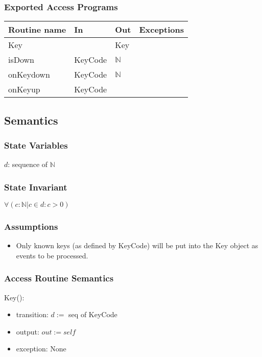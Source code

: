 \documentclass[12pt]{article}
\begin{document}
\subsubsection*{Exported Access Programs}

\begin{tabular}{| l | l | l | l |} %
\hline
\textbf{Routine name} & \textbf{In} & \textbf{Out} & \textbf{Exceptions}\\
\hline
Key &  & Key & ~\\
\hline
isDown & KeyCode & $\mathbb{N}$ & ~\\
\hline
onKeydown & KeyCode & $\mathbb{N}$ & ~\\
\hline
onKeyup & KeyCode &  & ~\\
\hline
\end{tabular}

\subsection*{Semantics}

\subsubsection*{State Variables}

$d$: sequence of $\mathbb{N}$\\

\subsubsection*{State Invariant}

$\forall (c : \mathbb{N} | c \in d : c \gt 0)$

\subsubsection*{Assumptions}

\begin{itemize}
    \item Only known keys (as defined by KeyCode) will be put into the Key object as events to be processed.
\end{itemize}

\subsubsection*{Access Routine Semantics}

Key():
\begin{itemize}
    \item transition: $d :=$ seq of KeyCode
    \item output: $out := \mathit{self}$
    \item exception: None
\end{itemize}
\end{document}
